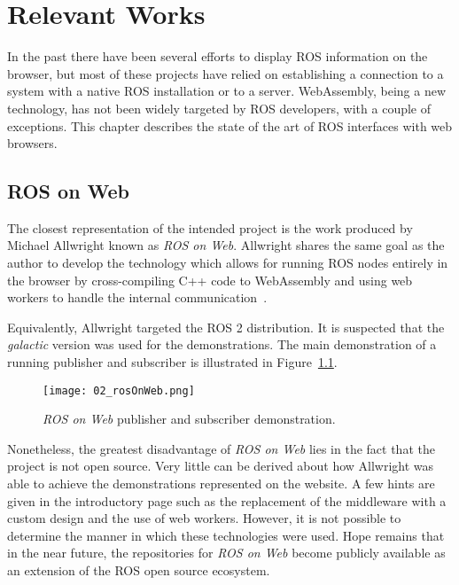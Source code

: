 \chapter{Relevant Works}\label{cha:literagure}

    In the past there have been several efforts to display \ac{ROS} information on the browser, but most of these projects have relied on establishing a connection to a system with a native \ac{ROS} installation or to a server. WebAssembly, being a new technology, has not been widely targeted by \ac{ROS} developers, with a couple of exceptions. This chapter describes the state of the art of \ac{ROS} interfaces with web browsers.


    \section{ROS on Web}

        The closest representation of the intended project is the work produced by Michael Allwright known as \textit{ROS on Web}. Allwright shares the same goal as the author to develop the technology which allows for running ROS nodes entirely in the browser by cross-compiling C++ code to WebAssembly and using web workers to handle the internal communication~\cite{rosonweb}.

        Equivalently, Allwright targeted the \ac{ROS} 2 distribution. It is suspected that the \textit{galactic} version was used for the demonstrations. The main demonstration of a running publisher and subscriber is illustrated in Figure~\ref{fig:rosonweb}.
        
        
        \begin{figure}[htbp]
            \centering
            \texttt{[image: 02\_rosOnWeb.png]}
            \caption{\textit{ROS on Web} publisher and subscriber demonstration.}
            \label{fig:rosonweb}
        \end{figure}

        Nonetheless, the greatest disadvantage of \textit{ROS on Web} lies in the fact that the project is not open source. Very little can be derived about how Allwright was able to achieve the demonstrations represented on the website. A few hints are given in the introductory page such as the replacement of the middleware with a custom design and the use of web workers. However, it is not possible to determine the manner in which these technologies were used. Hope remains that in the near future, the repositories for \textit{ROS on Web} become publicly available as an extension of the ROS open source ecosystem.

